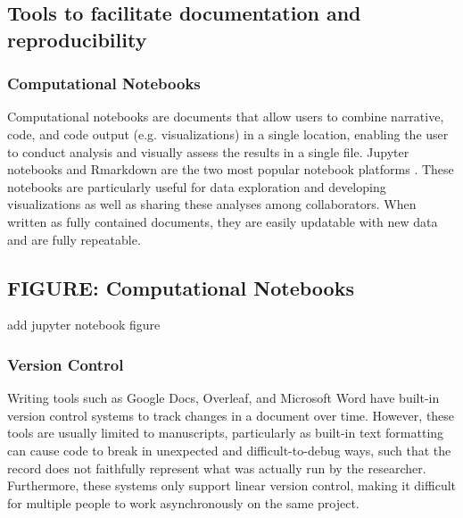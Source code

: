 \documentclass[10pt,letterpaper]{article}
\begin{document}

\subsection*{Tools to facilitate documentation and reproducibility}

\subsubsection*{Computational Notebooks} 

Computational notebooks are documents that allow users to combine narrative, code, and code output (e.g. visualizations) in a single location, enabling the user to conduct analysis and visually assess the results in a single file.
Jupyter notebooks and Rmarkdown are the two most popular notebook platforms \cite{kluyver2016jupyter, allaire2018rmarkdown}. 
These notebooks are particularly useful for data exploration and developing visualizations as well as sharing these analyses among collaborators. 
When written as fully contained documents, they are easily updatable with new data and are fully repeatable. 


 
\begin{greybox}{\subsection*{FIGURE: Computational Notebooks}
add jupyter notebook figure
}
\end{greybox}

\subsubsection*{Version Control} 

Writing tools such as Google Docs, Overleaf, and Microsoft Word have built-in version control systems to track changes in a document over time. 
However, these tools are usually limited to manuscripts, particularly as built-in text formatting can cause code to break in unexpected and difficult-to-debug ways, such that the record does not faithfully represent what was actually run by the researcher. 
Furthermore, these systems only support linear version control, making it difficult for multiple people to work asynchronously on the same project. 
\end{document}
